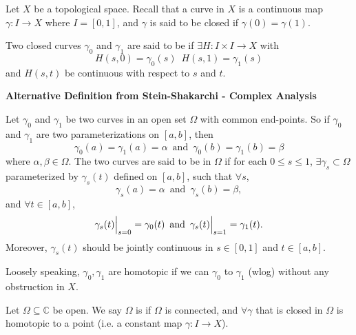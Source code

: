 \documentclass[notoc,notitlepage]{tufte-book}
\begin{document}
\begin{defn}\label{defn:homotopy}
  Let $X$ be a topological space. Recall that a curve in $X$ is a continuous map $\gamma : I \to X$ where $I = [0, 1]$, and $\gamma$ is said to be closed if $\gamma(0) = \gamma(1)$.

  Two closed curves $\gamma_0$ and $\gamma_1$ are said to be  if $\exists H : I \times I \to X$ with
  \begin{equation*}
    H(s, 0) = \gamma_0(s) \enspace H(s, 1) = \gamma_1(s)
  \end{equation*}
  and $H(s, t)$ be continuous with respect to $s$ and $t$.

  \textbf{Alternative Definition from Stein-Shakarchi - Complex Analysis}

  Let $\gamma_0$ and $\gamma_1$ be two curves in an open set $\Omega$ with common end-points. So if $\gamma_0$ and $\gamma_1$ are two parameterizations on $[a, b]$, then
  \begin{equation*}
    \gamma_0(a) = \gamma_1(a) = \alpha \enspace \text{and} \enspace \gamma_0(b) = \gamma_1(b) = \beta
  \end{equation*}
  where $\alpha, \beta \in \Omega$. The two curves are said to be  in $\Omega$ if for each $0 \leq s \leq 1$, $\exists \gamma_s \subset \Omega$ parameterized by $\gamma_s(t)$ defined on $[a, b]$, such that $\forall s$, 
  \begin{equation*}
    \gamma_s(a) = \alpha \enspace \text{and} \enspace \gamma_s(b) = \beta,
  \end{equation*}
  and $\forall t \in [a, b]$, 
  \begin{equation*}
    \gamma_s(t) \Big|_{s = 0}^{} = \gamma_0(t) \enspace \text{and} \enspace \gamma_s(t) \Big|_{s = 1}^{} = \gamma_1(t).
  \end{equation*}
  Moreover, $\gamma_s(t)$ should be jointly continuous in $s \in [0, 1]$ and $t \in [a, b]$.
\end{defn}

Loosely speaking, $\gamma_0, \gamma_1$ are homotopic if we can  $\gamma_0$ to $\gamma_1$ (wlog) without any obstruction in $X$.

\begin{defn}\label{defn:simply_connected_domain}
  Let $\Omega \subseteq \mathbb{C}$ be open. We say $\Omega$ is  if $\Omega$ is connected, and $\forall \gamma$ that is closed in $\Omega$ is homotopic to a point (i.e. a constant map $\gamma : I \to X$).
\end{defn}
\end{document}
